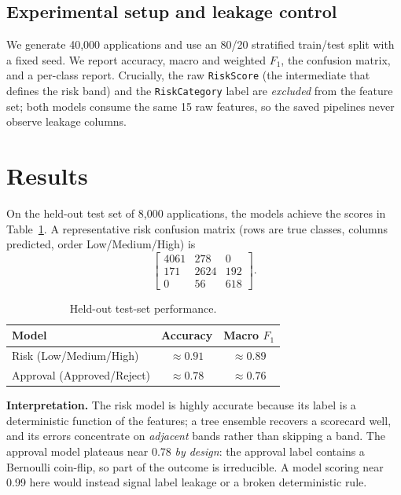 \documentclass[conference]{IEEEtran}
\begin{document}
\subsection{Experimental setup and leakage control}
We generate 40{,}000 applications and use an 80/20 stratified train/test split
with a fixed seed. We report accuracy, macro and weighted $F_1$, the confusion
matrix, and a per-class report. Crucially, the raw \texttt{RiskScore} (the
intermediate that defines the risk band) and the \texttt{RiskCategory} label are
\emph{excluded} from the feature set; both models consume the same 15 raw
features, so the saved pipelines never observe leakage columns.

\section{Results}

On the held-out test set of 8{,}000 applications, the models achieve the scores
in Table~\ref{tab:results}. A representative risk confusion matrix (rows are
true classes, columns predicted, order Low/Medium/High) is
\[
\begin{bmatrix}
4061 & 278 & 0 \\
171 & 2624 & 192 \\
0 & 56 & 618
\end{bmatrix}.
\]

\begin{table}[t]
\caption{Held-out test-set performance.}
\label{tab:results}
\centering
\renewcommand{\arraystretch}{1.25}
\begin{tabular}{lcc}
\toprule
\textbf{Model} & \textbf{Accuracy} & \textbf{Macro $F_1$} \\
\midrule
Risk (Low/Medium/High)     & $\approx 0.91$ & $\approx 0.89$ \\
Approval (Approved/Reject) & $\approx 0.78$ & $\approx 0.76$ \\
\bottomrule
\end{tabular}
\end{table}

\textbf{Interpretation.} The risk model is highly accurate because its label is
a deterministic function of the features; a tree ensemble recovers a scorecard
well, and its errors concentrate on \emph{adjacent} bands rather than skipping a
band. The approval model plateaus near 0.78 \emph{by design}: the approval label
contains a Bernoulli coin-flip, so part of the outcome is irreducible. A model
scoring near 0.99 here would instead signal label leakage or a broken
deterministic rule.
\end{document}
